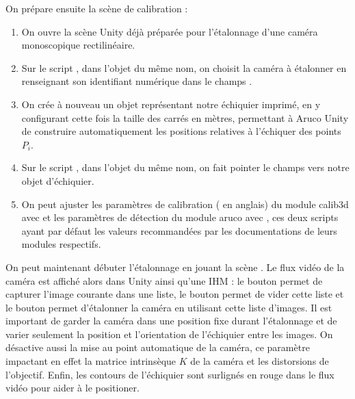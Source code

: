 On prépare ensuite la scène de calibration :
\begin{enumerate}
  \item On ouvre la scène Unity  déjà préparée pour l'étalonnage d'une caméra monoscopique rectilinéaire.
  \item Sur le script , dans l'objet du même nom, on choisit la caméra à étalonner en renseignant son identifiant numérique dans le champs .
  \item On crée à nouveau un objet représentant notre échiquier imprimé, en y configurant cette fois la taille des carrés en mètres, permettant à Aruco Unity de construire automatiquement les positions relatives à l'échiquer des points $P_i$.
  \item Sur le script , dans l'objet du même nom, on fait pointer le champs  vers notre objet d'échiquier.
  \item On peut ajuster les paramètres de calibration ( en anglais) du module calib3d avec  et les paramètres de détection du module aruco avec , ces deux scripts ayant par défaut les valeurs recommandées par les documentations de leurs modules respectifs.
\end{enumerate}


On peut maintenant débuter l'étalonnage en jouant la scène . Le flux vidéo de la caméra est affiché alors dans Unity ainsi qu'une IHM : le bouton  permet de capturer l'image courante dans une liste, le bouton  permet de vider cette liste et le bouton  permet d'étalonner la caméra en utilisant cette liste d'images. Il est important de garder la caméra dans une position fixe durant l'étalonnage et de varier seulement la position et l'orientation de l'échiquier entre les images. On désactive aussi la mise au point automatique de la caméra, ce paramètre impactant en effet la matrice intrinsèque	$K$ de la caméra et les distorsions de l'objectif. Enfin, les contours de l'échiquier sont surlignés en rouge dans le flux vidéo pour aider à le positioner.

